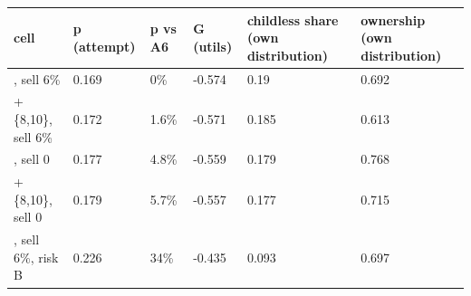 \begingroup\small
\setlength{\tabcolsep}{3pt}
\renewcommand{\arraystretch}{1.04}
\begin{tabularx}{\linewidth}{XXXXXX}
\toprule
cell & p (attempt) & p vs A6 & G (utils) & childless share (own distribution) & ownership (own distribution) \\
\midrule
[0,6], sell 6\% & 0.169 & 0\% & -0.574 & 0.19 & 0.692 \\
[0,6]+\{8,10\}, sell 6\% & 0.172 & 1.6\% & -0.571 & 0.185 & 0.613 \\
[0,6], sell 0 & 0.177 & 4.8\% & -0.559 & 0.179 & 0.768 \\
[0,6]+\{8,10\}, sell 0 & 0.179 & 5.7\% & -0.557 & 0.177 & 0.715 \\
[0,6], sell 6\%, risk B & 0.226 & 34\% & -0.435 & 0.093 & 0.697 \\
\bottomrule
\end{tabularx}
\endgroup

